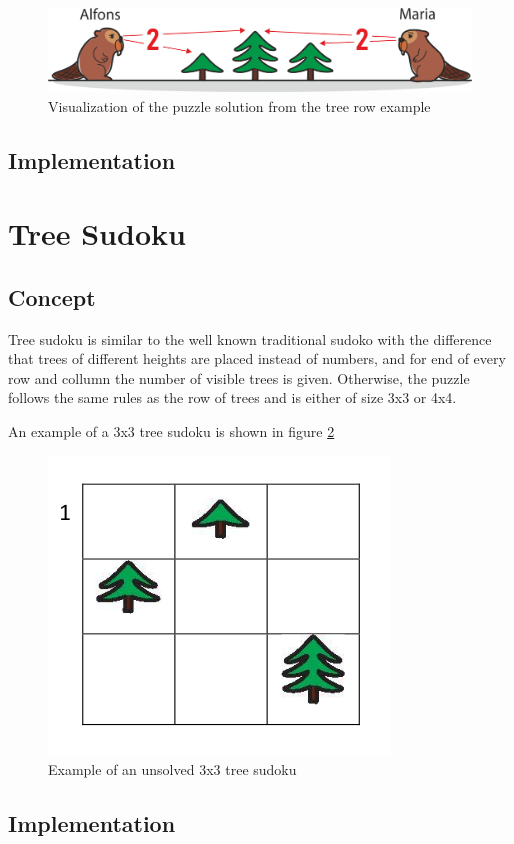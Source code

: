 \begin{figure} 
    \centering
    \includegraphics[width=0.8 \columnwidth]{figures/tree_row_example.png}
    \caption{Visualization of the puzzle solution from the tree row example} 
    \label{fig:tree_row_example} 
\end{figure}

\subsection{Implementation}

\section{Tree Sudoku}
\label{section:treeSudoku}

\subsection{Concept}
Tree sudoku is similar to the well known traditional sudoko with the difference that trees of different heights are placed instead of numbers, and for end of every row and collumn the number of visible trees is given. Otherwise, the puzzle follows the same rules as the row of trees and is either of size 3x3 or 4x4.

\begin{example}
    An example of a 3x3 tree sudoku is shown in figure \ref{fig:tree_sudoku_example}
\end{example}

\begin{figure} 
    \centering
    \includegraphics[width=0.4 \columnwidth]{figures/tree_sudoku_example.png}
    \caption{Example of an unsolved 3x3 tree sudoku} 
    \label{fig:tree_sudoku_example} 
\end{figure}

\subsection{Implementation}
